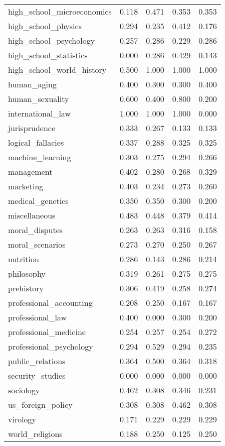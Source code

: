 \begin{tabular}{lrrrr}
high\_school\_microeconomics & 0.118 & 0.471 & 0.353 & 0.353 \\
high\_school\_physics & 0.294 & 0.235 & 0.412 & 0.176 \\
high\_school\_psychology & 0.257 & 0.286 & 0.229 & 0.286 \\
high\_school\_statistics & 0.000 & 0.286 & 0.429 & 0.143 \\
high\_school\_world\_history & 0.500 & 1.000 & 1.000 & 1.000 \\
human\_aging & 0.400 & 0.300 & 0.300 & 0.400 \\
human\_sexuality & 0.600 & 0.400 & 0.800 & 0.200 \\
international\_law & 1.000 & 1.000 & 1.000 & 0.000 \\
jurisprudence & 0.333 & 0.267 & 0.133 & 0.133 \\
logical\_fallacies & 0.337 & 0.288 & 0.325 & 0.325 \\
machine\_learning & 0.303 & 0.275 & 0.294 & 0.266 \\
management & 0.402 & 0.280 & 0.268 & 0.329 \\
marketing & 0.403 & 0.234 & 0.273 & 0.260 \\
medical\_genetics & 0.350 & 0.350 & 0.300 & 0.200 \\
miscellaneous & 0.483 & 0.448 & 0.379 & 0.414 \\
moral\_disputes & 0.263 & 0.263 & 0.316 & 0.158 \\
moral\_scenarios & 0.273 & 0.270 & 0.250 & 0.267 \\
nutrition & 0.286 & 0.143 & 0.286 & 0.214 \\
philosophy & 0.319 & 0.261 & 0.275 & 0.275 \\
prehistory & 0.306 & 0.419 & 0.258 & 0.274 \\
professional\_accounting & 0.208 & 0.250 & 0.167 & 0.167 \\
professional\_law & 0.400 & 0.000 & 0.300 & 0.200 \\
professional\_medicine & 0.254 & 0.257 & 0.254 & 0.272 \\
professional\_psychology & 0.294 & 0.529 & 0.294 & 0.235 \\
public\_relations & 0.364 & 0.500 & 0.364 & 0.318 \\
security\_studies & 0.000 & 0.000 & 0.000 & 0.000 \\
sociology & 0.462 & 0.308 & 0.346 & 0.231 \\
us\_foreign\_policy & 0.308 & 0.308 & 0.462 & 0.308 \\
virology & 0.171 & 0.229 & 0.229 & 0.229 \\
world\_religions & 0.188 & 0.250 & 0.125 & 0.250 \\
\bottomrule
\end{tabular}

